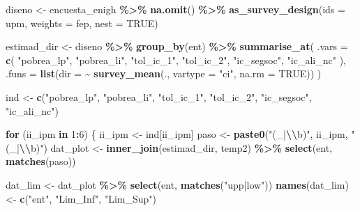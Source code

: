 \documentclass[
  12pt,
]{book}
\newenvironment{Shaded}{\begin{snugshade}}{\end{snugshade}}
\newcommand{\AttributeTok}[1]{\textcolor[rgb]{0.13,0.29,0.53}{#1}}
\newcommand{\ConstantTok}[1]{\textcolor[rgb]{0.56,0.35,0.01}{#1}}
\newcommand{\ControlFlowTok}[1]{\textcolor[rgb]{0.13,0.29,0.53}{\textbf{#1}}}
\newcommand{\DecValTok}[1]{\textcolor[rgb]{0.00,0.00,0.81}{#1}}
\newcommand{\FunctionTok}[1]{\textcolor[rgb]{0.13,0.29,0.53}{\textbf{#1}}}
\newcommand{\NormalTok}[1]{#1}
\newcommand{\OtherTok}[1]{\textcolor[rgb]{0.56,0.35,0.01}{#1}}
\newcommand{\SpecialCharTok}[1]{\textcolor[rgb]{0.81,0.36,0.00}{\textbf{#1}}}
\newcommand{\StringTok}[1]{\textcolor[rgb]{0.31,0.60,0.02}{#1}}
\begin{document}
\begin{Shaded}
\begin{Highlighting}[]
\NormalTok{diseno }\OtherTok{\textless{}{-}}\NormalTok{ encuesta\_enigh }\SpecialCharTok{\%\textgreater{}\%} \FunctionTok{na.omit}\NormalTok{() }\SpecialCharTok{\%\textgreater{}\%}
  \FunctionTok{as\_survey\_design}\NormalTok{(}\AttributeTok{ids =}\NormalTok{ upm,}
                   \AttributeTok{weights =}\NormalTok{ fep,}
                   \AttributeTok{nest =} \ConstantTok{TRUE}\NormalTok{)}

\NormalTok{estimad\_dir }\OtherTok{\textless{}{-}}\NormalTok{ diseno }\SpecialCharTok{\%\textgreater{}\%} \FunctionTok{group\_by}\NormalTok{(ent) }\SpecialCharTok{\%\textgreater{}\%}
  \FunctionTok{summarise\_at}\NormalTok{(}
    \AttributeTok{.vars =} \FunctionTok{c}\NormalTok{(}
      \StringTok{"pobrea\_lp"}\NormalTok{,}
      \StringTok{"pobrea\_li"}\NormalTok{,}
      \StringTok{"tol\_ic\_1"}\NormalTok{,}
      \StringTok{"tol\_ic\_2"}\NormalTok{,}
      \StringTok{"ic\_segsoc"}\NormalTok{,}
      \StringTok{"ic\_ali\_nc"}
\NormalTok{    ),}
    \AttributeTok{.funs =} \FunctionTok{list}\NormalTok{(}\AttributeTok{dir =} \SpecialCharTok{\textasciitilde{}} \FunctionTok{survey\_mean}\NormalTok{(., }\AttributeTok{vartype =} \StringTok{"ci"}\NormalTok{, }\AttributeTok{na.rm =} \ConstantTok{TRUE}\NormalTok{))}
\NormalTok{  )}

\NormalTok{ind }\OtherTok{\textless{}{-}}
  \FunctionTok{c}\NormalTok{(}\StringTok{"pobrea\_lp"}\NormalTok{,}
    \StringTok{"pobrea\_li"}\NormalTok{,}
    \StringTok{"tol\_ic\_1"}\NormalTok{,}
    \StringTok{"tol\_ic\_2"}\NormalTok{,}
    \StringTok{"ic\_segsoc"}\NormalTok{,}
    \StringTok{"ic\_ali\_nc"}\NormalTok{)}

\ControlFlowTok{for}\NormalTok{ (ii\_ipm }\ControlFlowTok{in} \DecValTok{1}\SpecialCharTok{:}\DecValTok{6}\NormalTok{) \{}
\NormalTok{  ii\_ipm }\OtherTok{\textless{}{-}}\NormalTok{ ind[ii\_ipm]}
\NormalTok{  paso }\OtherTok{\textless{}{-}} \FunctionTok{paste0}\NormalTok{(}\StringTok{"(\_|}\SpecialCharTok{\textbackslash{}\textbackslash{}}\StringTok{b)"}\NormalTok{, ii\_ipm, }\StringTok{"(\_|}\SpecialCharTok{\textbackslash{}\textbackslash{}}\StringTok{b)"}\NormalTok{)}
\NormalTok{  dat\_plot }\OtherTok{\textless{}{-}} \FunctionTok{inner\_join}\NormalTok{(estimad\_dir, temp2) }\SpecialCharTok{\%\textgreater{}\%}
    \FunctionTok{select}\NormalTok{(ent, }\FunctionTok{matches}\NormalTok{(paso))}
  
\NormalTok{  dat\_lim }\OtherTok{\textless{}{-}}\NormalTok{ dat\_plot }\SpecialCharTok{\%\textgreater{}\%} \FunctionTok{select}\NormalTok{(ent, }\FunctionTok{matches}\NormalTok{(}\StringTok{"upp|low"}\NormalTok{))}
  \FunctionTok{names}\NormalTok{(dat\_lim) }\OtherTok{\textless{}{-}} \FunctionTok{c}\NormalTok{(}\StringTok{"ent"}\NormalTok{, }\StringTok{"Lim\_Inf"}\NormalTok{, }\StringTok{"Lim\_Sup"}\NormalTok{)}
  

\end{Highlighting}
\end{Shaded}
\end{document}
